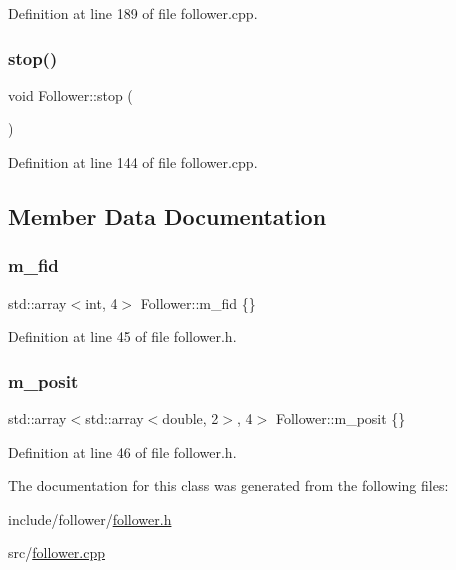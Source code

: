 Definition at line 189 of file follower.\+cpp.

\mbox{\label{class_follower_a84c17a75630c27bea4f401c8ab8e45b2}} 
\subsubsection{\texorpdfstring{stop()}{stop()}}
{\footnotesize\ttfamily void Follower\+::stop (\begin{DoxyParamCaption}{ }\end{DoxyParamCaption})}



Definition at line 144 of file follower.\+cpp.



\subsection{Member Data Documentation}
\mbox{\label{class_follower_a350054bbd7659d493cccc4b4ad9bc460}} 
\subsubsection{\texorpdfstring{m\+\_\+fid}{m\_fid}}
{\footnotesize\ttfamily std\+::array$<$int, 4$>$ Follower\+::m\+\_\+fid \{\}}



Definition at line 45 of file follower.\+h.

\mbox{\label{class_follower_a6d4e1ebbe79cc8af601d53cba7aeb30a}} 
\subsubsection{\texorpdfstring{m\+\_\+posit}{m\_posit}}
{\footnotesize\ttfamily std\+::array$<$std\+::array$<$double, 2$>$, 4$>$ Follower\+::m\+\_\+posit \{\}}



Definition at line 46 of file follower.\+h.



The documentation for this class was generated from the following files\+:\begin{DoxyCompactItemize}
\item 
include/follower/\hyperlink{follower_8h}{follower.\+h}\item 
src/\hyperlink{follower_8cpp}{follower.\+cpp}\end{DoxyCompactItemize}
